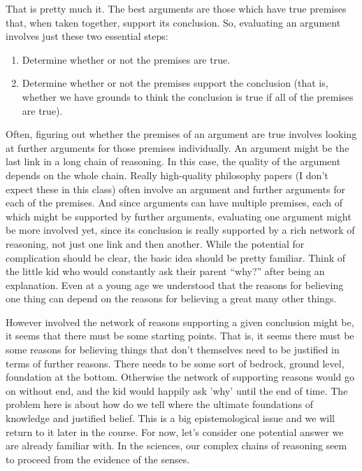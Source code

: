 That is pretty much it. The best arguments are those which have true premises that, when taken together, support its conclusion. So, evaluating an argument involves just these two essential steps:
\begin{enumerate}
    \item Determine whether or not the premises are true.
    \item Determine whether or not the premises support the conclusion (that is, whether we have grounds to think the conclusion is true if all of the premises are true).
\end{enumerate}
Often, figuring out whether the premises of an argument are true involves looking at further arguments for those premises individually. An argument might be the last link in a long chain of reasoning. In this case, the quality of the argument depends on the whole chain. Really high-quality philosophy papers (I don't expect these in this class) often involve an argument and further arguments for each of the premises. And since arguments can have multiple premises, each of which might be supported by further arguments, evaluating one argument might be more involved yet, since its conclusion is really supported by a rich network of reasoning, not just one link and then another. While the potential for complication should be clear, the basic idea should be pretty familiar. Think of the little kid who would constantly ask their parent “why?” after being an explanation. Even at a young age we understood that the reasons for believing one thing can depend on the reasons for believing a great many other things.

However involved the network of reasons supporting a given conclusion might be, it seems that there must be some starting points. That is, it seems there must be some reasons for believing things that don’t themselves need to be justified in terms of further reasons. There needs to be some sort of bedrock, ground level, foundation at the bottom. Otherwise the network of supporting reasons would go on without end, and the kid would happily ask 'why' until the end of time. The problem here is about how do we tell where the ultimate foundations of knowledge and justified belief. This is a big epistemological issue and we will return to it later in the course. For now, let’s consider one potential answer we are already familiar with. In the sciences, our complex chains of reasoning seem to proceed from the evidence of the senses.

